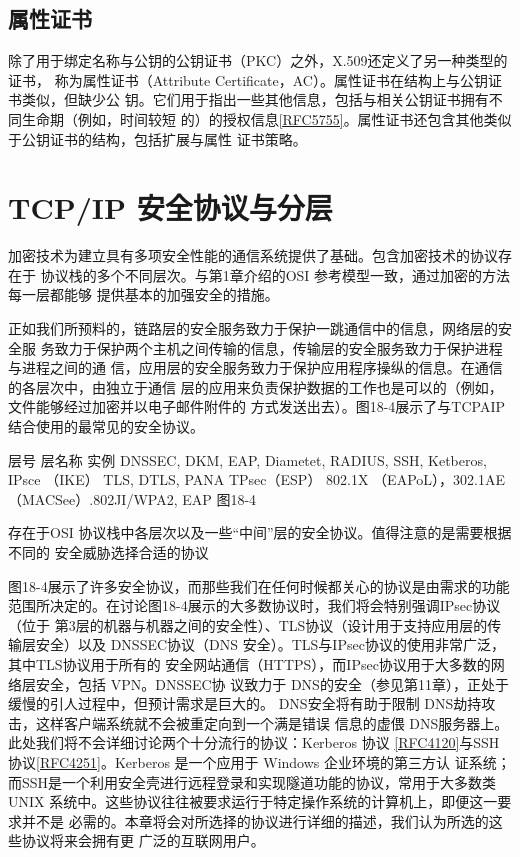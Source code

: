 \subsection{属性证书}

除了用于绑定名称与公钥的公钥证书（PKC）之外，X.509还定义了另一种类型的证书，
称为属性证书（Attribute Certificate，AC）。属性证书在结构上与公钥证书类似，但缺少公
钥。它们用于指出一些其他信息，包括与相关公钥证书拥有不同生命期（例如，时间较短
的）的授权信息\href{https://www.rfc-editor.org/rfc/rfc5755}{[RFC5755]}。属性证书还包含其他类似于公钥证书的结构，包括扩展与属性
证书策略。

\section{TCP/IP 安全协议与分层}
加密技术为建立具有多项安全性能的通信系统提供了基础。包含加密技术的协议存在于
协议栈的多个不同层次。与第1章介绍的OSI 参考模型一致，通过加密的方法每一层都能够
提供基本的加强安全的措施。

正如我们所预料的，链路层的安全服务致力于保护一跳通信中的信息，网络层的安全服
务致力于保护两个主机之间传输的信息，传输层的安全服务致力于保护进程与进程之间的通
信，应用层的安全服务致力于保护应用程序操纵的信息。在通信的各层次中，由独立于通信
层的应用来负责保护数据的工作也是可以的（例如，文件能够经过加密并以电子邮件附件的
方式发送出去）。图18-4展示了与TCPAIP结合使用的最常见的安全协议。

层号
层名称
实例
DNSSEC, DKM, EAP, Diametet, RADIUS, SSH, Ketberos, IPsce （IKE）
TLS, DTLS, PANA
TPsec（ESP）
802.1X （EAPoL），302.1AE （MACSee）.802JI/WPA2, EAP
图18-4

存在于OSI 协议栈中各层次以及一些“中间”层的安全协议。值得注意的是需要根据不同的
安全威胁选择合适的协议

图18-4展示了许多安全协议，而那些我们在任何时候都关心的协议是由需求的功能
范围所决定的。在讨论图18-4展示的大多数协议时，我们将会特别强调IPsec协议（位于
第3层的机器与机器之间的安全性）、TLS协议（设计用于支持应用层的传输层安全）以及
DNSSEC协议（DNS 安全）。TLS与IPsec协议的使用非常广泛，其中TLS协议用于所有的
安全网站通信（HTTPS），而IPsec协议用于大多数的网络层安全，包括 VPN。DNSSEC协
议致力于 DNS的安全（参见第11章），正处于缓慢的引人过程中，但预计需求是巨大的。
DNS安全将有助于限制 DNS劫持攻击，这样客户端系统就不会被重定向到一个满是错误
信息的虚偎 DNS服务器上。此处我们将不会详细讨论两个十分流行的协议：Kerberos 协议
\href{https://www.rfc-editor.org/rfc/rfc4120}{[RFC4120]}与SSH协议\href{https://www.rfc-editor.org/rfc/rfc4251}{[RFC4251]}。Kerberos 是一个应用于 Windows 企业环境的第三方认
证系统；而SSH是一个利用安全壳进行远程登录和实现隧道功能的协议，常用于大多数类
UNIX 系统中。这些协议往往被要求运行于特定操作系统的计算机上，即便这一要求并不是
必需的。本章将会对所选择的协议进行详细的描述，我们认为所选的这些协议将来会拥有更
广泛的互联网用户。

